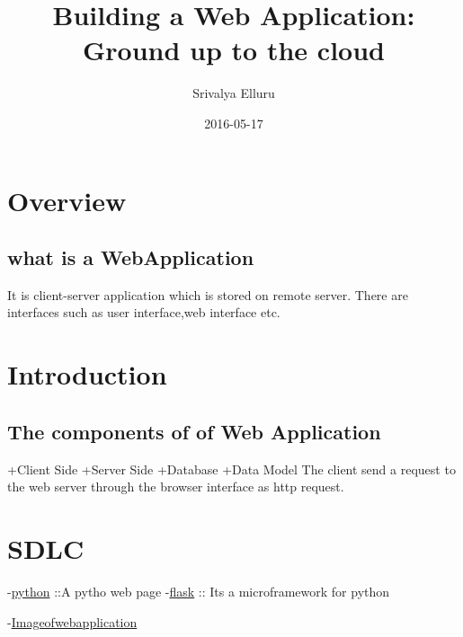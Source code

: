 \documentclass[11pt]{article}
\title{Building a Web Application:  Ground up to the cloud}
\author{Srivalya Elluru}
\date{2016-05-17}
\begin{document}
\maketitle

\setcounter{tocdepth}{3}
\tableofcontents
\vspace*{1cm}

\section{Overview}
\label{sec-1}
\subsection{what is a WebApplication}
\label{sec-1-1}

 It is client-server application which is stored on remote server.
 There are interfaces such as user interface,web interface etc.
 
  
\section{Introduction}
\label{sec-2}
\subsection{The components of of Web Application}
\label{sec-2-1}

   +Client Side
   +Server Side
   +Database 
   +Data Model
   The client send a request to the web server through the browser
   interface as http request.
\section{SDLC}
\label{sec-3}


  -\href{http://python.org}{python} ::A pytho web page    
  -\href{http://flask.pocoo.org/}{flask} :: Its a microframework for python

  -\href{file:///home/home/Downloads/IMG_20160517_092640205.jpg}{Imageofwebapplication}
\end{document}
